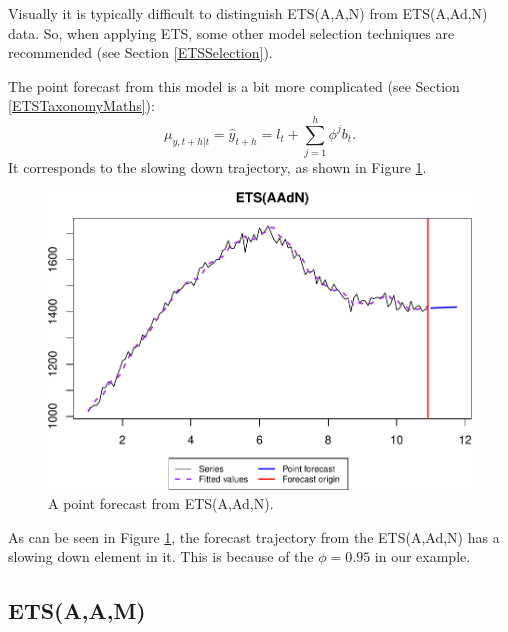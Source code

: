 \documentclass[
]{book}
\theoremstyle{definition}
\theoremstyle{definition}
\theoremstyle{definition}
\theoremstyle{definition}
\theoremstyle{remark}
\begin{document}
Visually it is typically difficult to distinguish ETS(A,A,N) from ETS(A,Ad,N) data. So, when applying ETS, some other model selection techniques are recommended (see Section \ref{ETSSelection}).

The point forecast from this model is a bit more complicated (see Section \ref{ETSTaxonomyMaths}):
\begin{equation}
    \mu_{y,t+h|t} = \hat{y}_{t+h} = l_{t} + \sum_{j=1}^h \phi^j b_t.
  \label{eq:ETSAANForecast}
\end{equation}
It corresponds to the slowing down trajectory, as shown in Figure \ref{fig:ETSAAdNExampleForecast}.

\begin{figure}
\centering
\includegraphics{adam_files/figure-latex/ETSAAdNExampleForecast-1.pdf}
\caption{\label{fig:ETSAAdNExampleForecast}A point forecast from ETS(A,Ad,N).}
\end{figure}

As can be seen in Figure \ref{fig:ETSAAdNExampleForecast}, the forecast trajectory from the ETS(A,Ad,N) has a slowing down element in it. This is because of the \(\phi=0.95\) in our example.

\hypertarget{ETSAAMModel}{%
\subsection{ETS(A,A,M)}\label{ETSAAMModel}}
\end{document}
